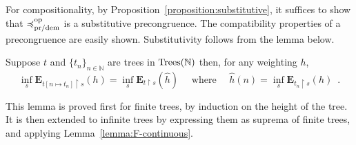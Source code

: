 For compositionality, by Proposition~\ref{proposition:substitutive}, it suffices to show
that $\preccurlyeq^{\text{op}}_{\text{pr/dem}}$ is a substitutive precongruence. The compatibility properties 
of a precongruence are easily shown. Substitutivity follows from the lemma below.
%
\begin{lemma}
Suppose $t$ and 
$\{ t_n \}_{n \in \mathbb{N}}$ are trees in 
            $\textnormal{Trees}(\mathbb{N})$ then, for any weighting $h$,
             \begin{equation*}
                \inf_s \mathbf{E}_{t [ n \mapsto t_n ] \restriction  s } (h)
                = 
                \inf_s \mathbf{E}_{t \restriction  s} (\hat{h})
                \quad \text{ where } \quad \hat{h} (n) = \inf_s \mathbf{E}_{t_n \restriction  s} (h) \enspace .
            \end{equation*}
\end{lemma}
This lemma is proved first for finite trees, by induction on the height of the tree. It is then extended to infinite trees
by expressing them as suprema of finite trees, and applying Lemma~\ref{lemma:F-continuous}.
%
%            
%
%
% 

